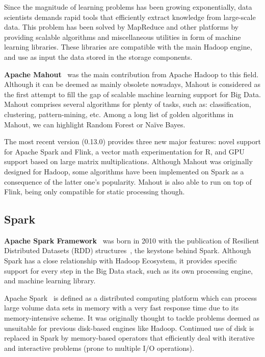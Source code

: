 \documentclass[3p,review]{elsarticle}
\begin{document}
Since the magnitude of learning problems has been growing exponentially, data scientists demands rapid tools that efficiently extract knowledge from large-scale data. This problem has been solved by MapReduce and other platforms by providing scalable algorithms and miscellaneous utilities in form of machine learning libraries. These libraries are compatible with the main Hadoop engine, and use as input the data stored in the storage components. 

\textbf{Apache Mahout}~\cite{mahout} was the main contribution from Apache Hadoop to this field. Although it can be deemed as mainly obsolete nowadays, Mahout is considered as the first attempt to fill the gap of scalable machine learning support for Big Data. Mahout comprises several algorithms for plenty of tasks, such as: classification, clustering, pattern-mining, etc. Among a long list of golden algorithms in Mahout, we can highlight Random Forest or Na\"ive Bayes. 

The most recent version (0.13.0) provides three new major features: novel support for Apache Spark and Flink, a vector math experimentation for R, and GPU support based on large matrix multiplications. Although Mahout was originally designed for Hadoop, some algorithms have been implemented on Spark as a consequence of the latter one's popularity. Mahout is also able to run on top of Flink, being only compatible for static processing though.

\subsection{Spark}\label{subsec:spark}

\textbf{Apache Spark Framework}~\cite{spark} was born in 2010 with the publication of Resilient Distributed Datasets (RDD) structures~\cite{zaharia12}, the keystone behind Spark. Although Spark has a close relationship with Hadoop Ecosystem, it provides specific support for every step in the Big Data stack, such as its own processing engine, and machine learning library. 

Apache Spark~\cite{hamstra15} is defined as a distributed computing platform which can process large volume data sets in memory with a very fast response time due to its memory-intensive scheme. It was originally thought to tackle problems deemed as unsuitable for previous disk-based engines like Hadoop. Continued use of disk is replaced in Spark by memory-based operators that efficiently deal with iterative and interactive problems (prone to multiple I/O operations). 
\end{document}
